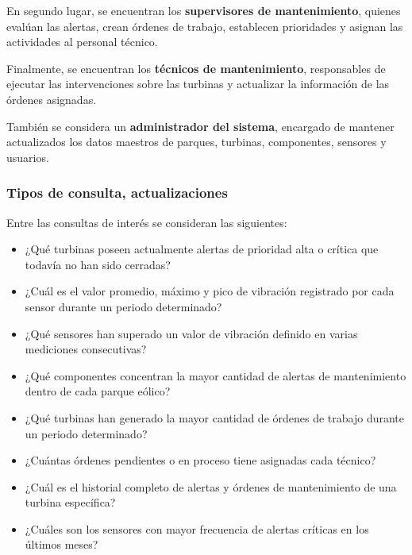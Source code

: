 \documentclass[11pt,a4paper]{article}
\begin{document}
En segundo lugar, se encuentran los \textbf{supervisores de mantenimiento}, quienes
evalúan las alertas, crean órdenes de trabajo, establecen prioridades y asignan las
actividades al personal técnico.

Finalmente, se encuentran los \textbf{técnicos de mantenimiento}, responsables de
ejecutar las intervenciones sobre las turbinas y actualizar la información de las
órdenes asignadas.

También se considera un \textbf{administrador del sistema}, encargado de mantener
actualizados los datos maestros de parques, turbinas, componentes, sensores y
usuarios.

\subsubsection{Tipos de consulta, actualizaciones}

Entre las consultas de interés se consideran las siguientes:

\begin{itemize}[label={}, leftmargin=0cm, itemsep=0.3cm]
    \item ¿Qué turbinas poseen actualmente alertas de prioridad alta o crítica que
    todavía no han sido cerradas?

    \item ¿Cuál es el valor promedio, máximo y pico de vibración registrado por cada
    sensor durante un periodo determinado?

    \item ¿Qué sensores han superado un valor de vibración definido en varias
    mediciones consecutivas?

    \item ¿Qué componentes concentran la mayor cantidad de alertas de mantenimiento
    dentro de cada parque eólico?

    \item ¿Qué turbinas han generado la mayor cantidad de órdenes de trabajo durante
    un periodo determinado?

    \item ¿Cuántas órdenes pendientes o en proceso tiene asignadas cada técnico?

    \item ¿Cuál es el historial completo de alertas y órdenes de mantenimiento de una
    turbina específica?

    \item ¿Cuáles son los sensores con mayor frecuencia de alertas críticas en los
    últimos meses?
\end{itemize}
\end{document}
